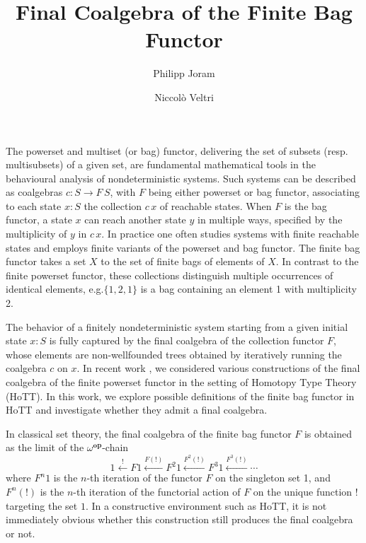 \documentclass{easychair}
\begin{document}
  \title{Final Coalgebra of the Finite Bag Functor}
  \author{%
      Philipp Joram \and
      Niccol{\`o} Veltri
  }

  \maketitle

  \setcounter{tocdepth}{1}

  The powerset and multiset (or bag) functor, delivering the set of
  subsets (resp. multisubsets) of a given set, are fundamental
  mathematical tools in the behavioural analysis of nondeterministic
  systems. Such systems can be described as coalgebras $c : S \to
  F\, S$, with $F$ being either powerset or bag functor, associating
  to each state $x : S$ the collection $c \, x$ of reachable
  states. When $F$ is the bag functor, a state $x$ can reach
  another state $y$ in multiple ways, specified by the multiplicity of
  $y$ in $c\,x$. In practice one often studies systems with finite reachable
  states and employs finite variants of the powerset and bag functor.
  The finite bag functor takes a set $X$ to the set of finite
  bags of elements of $X$.  In contrast to the finite powerset
  functor, these collections distinguish multiple occurrences of
  identical elements, e.g.\@ $\{1, 2, 1\}$ is a bag containing an element
  1 with multiplicity 2.
  
  The behavior of a finitely nondeterministic system starting from a
  given initial state $x : S$ is fully captured by the final coalgebra
  of the collection functor $F$, whose elements are non-wellfounded
  trees obtained by iteratively running the coalgebra $c$ on $x$. In
  recent work \cite{Veltri2021}, we considered various constructions
  of the final coalgebra of the finite powerset functor in the setting
  of Homotopy Type Theory (HoTT). In this work, we explore possible
  definitions of the finite bag functor in HoTT and investigate
  whether they admit a final coalgebra.

  In classical set theory, the final coalgebra of the finite bag
  functor $F$ is obtained as the limit of the
  $\omega^{\operatorname{\mathbf{op}}}$-chain
  \cite[{Ch. 3.3.13}]{Adamek2021}
  \begin{equation}\label{eq:chain}
    1 \xleftarrow{!} {F 1}
      \xleftarrow{F(!)} {F^2 1}
      \xleftarrow{F^2(!)} {F^3 1}
      \xleftarrow{F^3(!)}
      \cdots
  \end{equation}
  where $F^n 1$ is the $n$-th iteration of the functor $F$ on the
  singleton set 1, and $F^n(!)$ is the $n$-th iteration of the
  functorial action of $F$ on the unique function $!$ targeting the set
  $1$. In a constructive environment such as HoTT, it is not
  immediately obvious whether this construction still produces the
  final coalgebra or not.
\end{document}
